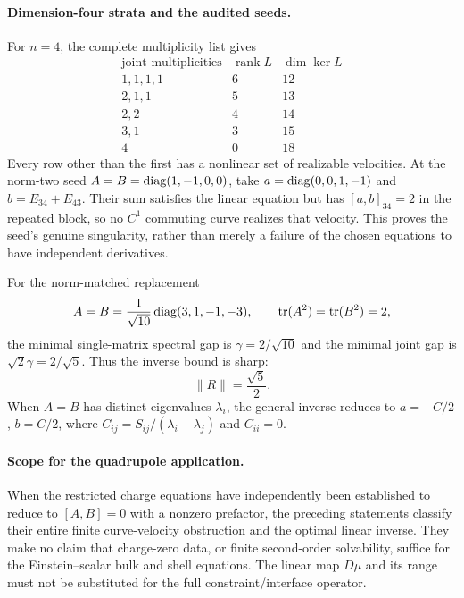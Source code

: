 \paragraph{Dimension-four strata and the audited seeds.}
For $n=4$, the complete multiplicity list gives
\[
\begin{array}{c|r|r}
\text{joint multiplicities}&\operatorname{rank}L&\dim\ker L\\ \hline
1,1,1,1&6&12\\
2,1,1&5&13\\
2,2&4&14\\
3,1&3&15\\
4&0&18
\end{array}
\]
Every row other than the first has a nonlinear set of realizable velocities.
At the norm-two seed $A=B=\operatorname{diag}(1,-1,0,0)$, take
$a=\operatorname{diag}(0,0,1,-1)$ and $b=E_{34}+E_{43}$.  Their sum satisfies the linear
equation but has $[a,b]_{34}=2$ in the repeated block, so no $C^1$ commuting
curve realizes that velocity.  This proves the seed's genuine
singularity, rather than merely a failure of the chosen equations to have
independent derivatives.

For the norm-matched replacement
\[
 A=B=\frac1{\sqrt{10}}\operatorname{diag}(3,1,-1,-3),\qquad
 \operatorname{tr}(A^2)=\operatorname{tr}(B^2)=2,
\]
the minimal single-matrix spectral gap is $\gamma=2/\sqrt{10}$ and the
minimal joint gap is $\sqrt2\gamma=2/\sqrt5$.  Thus the inverse bound is sharp:
\[
 \|R\|=\frac{\sqrt5}{2}.
\]
When $A=B$ has distinct eigenvalues $\lambda_i$, the general inverse
reduces to $a=-C/2$, $b=C/2$, where
$C_{ij}=S_{ij}/(\lambda_i-\lambda_j)$ and $C_{ii}=0$.

\paragraph{Scope for the quadrupole application.}
When the restricted charge equations have independently been established
to reduce to $[A,B]=0$ with a nonzero prefactor, the preceding statements
classify their entire finite curve-velocity obstruction and the optimal
linear inverse.  They make no claim that charge-zero data, or finite
second-order solvability, suffice for the Einstein--scalar bulk and shell
equations.  The linear map $D\mu$ and its range must not be substituted for
the full constraint/interface operator.
